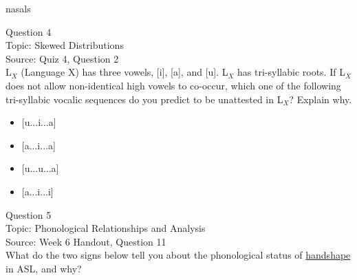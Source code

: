 \documentclass[12pt]{article}
\begin{document}
nasals


\newpage

{\large Question 4}\\

Topic: Skewed Distributions\\
Source: Quiz 4, Question 2\\

L$_X$ (Language X) has three vowels, [i], [a], and [u]. L$_X$ has tri-syllabic roots. If L$_X$ does not allow non-identical high vowels to co-occur, which one of the following tri-syllabic vocalic sequences do you predict to be unattested in L$_X$? Explain why.\\

\begin{itemize} \item {[u...i...a]} \item {[a...i...a]} \item {[u...u...a]} \item {[a...i...i]} \end{itemize}


\newpage

{\large Question 5}\\

Topic: Phonological Relationships and Analysis\\
Source: Week 6 Handout, Question 11\\

What do the two signs below tell you about the phonological status of \underline{handshape} in ASL, and why?\\
\end{document}
